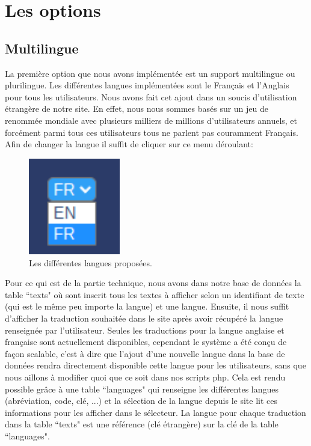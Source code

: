 \documentclass[a4paper,11pt]{article}
\begin{document}
\section{Les options}
\subsection{Multilingue}
La première option que nous avons implémentée est un support multilingue ou plurilingue. Les différentes langues implémentées sont le Français et l'Anglais pour tous les utilisateurs. Nous avons fait cet ajout dans un soucis d'utilisation étrangère de notre site. En effet, nous nous sommes basés sur un jeu de renommée mondiale avec plusieurs milliers de millions d'utilisateurs annuels, et forcément parmi tous ces utilisateurs tous ne parlent pas couramment Français.\\

Afin de changer la langue il suffit de cliquer sur ce menu déroulant:
\begin{figure}[!h]
\centerline{\includegraphics[width=4cm]{images/menuLangues.PNG}}
\caption{Les différentes langues proposées.}
\label{fig}
\end{figure}

Pour ce qui est de la partie technique, nous avons dans notre base de données la table ``texts" où sont inscrit tous les textes à afficher selon un identifiant de texte (qui est le même peu importe la langue) et une langue. Ensuite, il nous suffit d'afficher la traduction souhaitée dans le site après avoir récupéré la langue renseignée par l'utilisateur. Seules les traductions pour la langue anglaise et française sont actuellement disponibles, cependant le système a été conçu de façon scalable, c'est à dire que l'ajout d'une nouvelle langue dans la base de données rendra directement disponible cette langue pour les utilisateurs, sans que nous aillons à modifier quoi que ce soit dans nos scripts php. Cela est rendu possible grâce à une table ``languages" qui renseigne les différentes langues (abréviation, code, clé, ...) et la sélection de la langue depuis le site lit ces informations pour les afficher dans le sélecteur. La langue pour chaque traduction dans la table  ``texts" est une référence (clé étrangère) sur la clé de la table ``languages".
\end{document}
